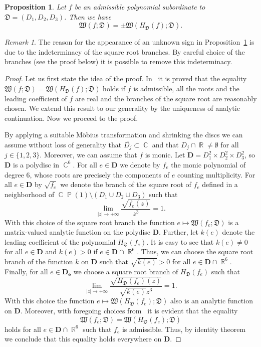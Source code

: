 \documentclass{amsart}
\numberwithin{equation}{section}
\newtheorem{proposition}[theorem]{Proposition}
\theoremstyle{definition}
\theoremstyle{remark}
\newtheorem*{remark}{Remark}
\DeclareMathOperator{\CC}{\mathbb C}
\DeclareMathOperator{\RR}{\mathbb R}
\DeclareMathOperator{\PP}{\mathbb P}
\begin{document}
	
	\begin{proposition}\label{propPeriodsRelationWithSubordination}
		Let $f$ be an admissible polynomial subordinate to $\mathfrak D = (D_1, D_2, D_3)$. Then we have
		\[
		\mathfrak W(f; \mathfrak D) = \pm \mathfrak W(H_{\mathfrak D}(f); \mathfrak D).
		\]
	\end{proposition}
	\begin{remark}
		The reason for the appearance of an unknown sign in Proposition~\ref{propPeriodsRelationWithSubordination} is due to the indeterminacy of the square root branches. By careful choice of the branches (see the proof below) it is possible to remove this indeterminacy.
	\end{remark}
	\begin{proof}
		Let us first state the idea of the proof. In~\cite[Section~3.1]{BostMestre} it is proved that the equality $\mathfrak W(f; \mathfrak D) = \mathfrak W(H_{\mathfrak D}(f); \mathfrak D)$ holds if $f$ is admissible, all the roots and the leading coefficient of $f$ are real and the branches of the square root are reasonably chosen. We extend this result to our generality by the uniqueness of analytic continuation. Now we proceed to the proof.
		
		By applying a suitable M\"obius transformation and shrinking the discs we can assume without loss of generality that $\overline{D_j} \subset \CC$ and that $D_j \cap \RR \ne \emptyset$ for all $j \in \{1,2,3\}$. Moreover, we can assume that $f$ is monic. Let $\mathbf{D} = D_1^2 \times D_2^2 \times D_3^2$, so $\mathbf{D}$ is a polydisc in $\CC^6$. For all $e \in \mathbf{D}$ we denote by $f_e$ the monic polynomial of degree $6$, whose roots are precisely the components of $e$ counting multiplicity. For all $e \in \mathbf{D}$ by $\sqrt{f_e}$ we denote the branch of the square root of $f_e$ defined in a neighborhood of $\CC\PP(1) \setminus (D_1 \cup D_2 \cup D_3)$ such that
		\[
		\lim_{|z| \to +\infty} \frac{\sqrt{f_e(z)}}{z^3} = 1.
		\]
		With this choice of the square root branch the function $e \mapsto \mathfrak W(f_e; \mathfrak D)$ is a matrix-valued analytic function on the polydisc $\mathbf{D}$. Further, let $k(e)$ denote the leading coefficient of the polynomial $H_{\mathfrak D}(f_e)$. It is easy to see that $k(e) \ne 0$ for all $e \in \mathbf{D}$ and $k(e) > 0$ if $e \in \mathbf{D} \cap \RR^6$. Thus, we can choose the square root branch of the function $k$ on $\mathbf{D}$ such that $\sqrt{k(e)} > 0$ for all $e \in \mathbf{D} \cap \RR^6$. Finally, for all $e \in \mathbf{D_e}$ we choose a square root branch of $H_{\mathfrak D}(f_e)$ such that 
		\[
		\lim_{|z| \to +\infty} \frac{\sqrt{H_{\mathfrak D}(f_e)(z)}}{\sqrt{k(e)}z^3} = 1.
		\]
		With this choice the function $e \mapsto \mathfrak W(H_{\mathfrak D}(f_e); \mathfrak D)$ also is an analytic function on $\mathbf{D}$. Moreover, with foregoing choices from~\cite[Section~3.1]{BostMestre} it is evident that the equality
		\[
		\mathfrak W(f_e; \mathfrak D) = \mathfrak W(H_{\mathfrak D}(f_e); \mathfrak D)
		\]
		holds for all $e \in \mathbf{D} \cap \RR^6$ such that $f_e$ is admissible. Thus, by identity theorem~\cite[\S~1.1]{Grauert} we conclude that this equality holds everywhere on $\mathbf{D}$.
	\end{proof}
\end{document}
